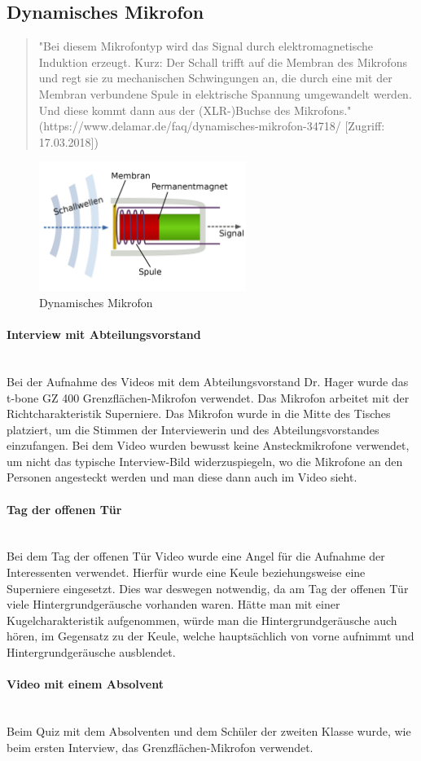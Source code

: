 \subsection{Dynamisches Mikrofon}
\begin{quote}
"Bei diesem Mikrofontyp wird das Signal durch elektromagnetische Induktion erzeugt. Kurz: Der Schall trifft auf die Membran des Mikrofons und regt sie zu mechanischen Schwingungen an, die durch eine mit der Membran verbundene Spule in elektrische Spannung umgewandelt werden. Und diese kommt dann aus der (XLR-)Buchse des Mikrofons." (https://www.delamar.de/faq/dynamisches-mikrofon-34718/ [Zugriff: 17.03.2018])
\end{quote} 
\begin{figure}[H]
	\centering
	\includegraphics[width=0.6\textwidth]{abb9} 
	\caption[Dynamisches Mikrofon]{Dynamisches Mikrofon\footnotemark}
\end{figure}
\paragraph{Interview mit Abteilungsvorstand}
\leavevmode \\
Bei der Aufnahme des Videos mit dem Abteilungsvorstand Dr. Hager wurde das t-bone GZ 400 Grenzflächen-Mikrofon verwendet. Das Mikrofon arbeitet mit der Richtcharakteristik Superniere. Das Mikrofon wurde in die Mitte des Tisches platziert, um die Stimmen der Interviewerin und des Abteilungsvorstandes einzufangen.\newline
Bei dem Video wurden bewusst keine Ansteckmikrofone verwendet, um nicht das typische Interview-Bild widerzuspiegeln, wo die Mikrofone an den Personen angesteckt werden und man diese dann auch im Video sieht.
\paragraph{Tag der offenen Tür}
\leavevmode \\
Bei dem Tag der offenen Tür Video wurde eine Angel für die Aufnahme der Interessenten verwendet. Hierfür wurde eine Keule beziehungsweise eine Superniere eingesetzt. Dies war deswegen notwendig, da am Tag der offenen Tür viele Hintergrundgeräusche vorhanden waren. Hätte man mit einer Kugelcharakteristik aufgenommen, würde man die Hintergrundgeräusche auch hören, im Gegensatz zu der Keule, welche hauptsächlich von vorne aufnimmt und Hintergrundgeräusche ausblendet.
\paragraph{Video mit einem Absolvent}
\leavevmode \\
Beim Quiz mit dem Absolventen und dem Schüler der zweiten Klasse wurde, wie beim ersten Interview, das Grenzflächen-Mikrofon verwendet.